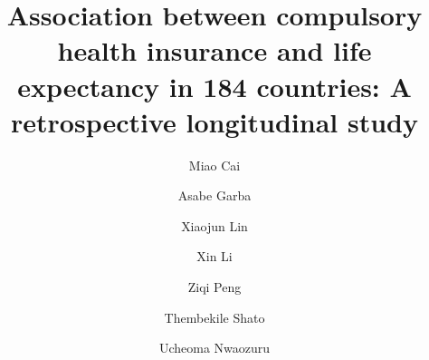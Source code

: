 \documentclass[]{elsarticle} %
\begin{document}
\begin{frontmatter}

  \title{Association between compulsory health insurance and life expectancy in 184 countries: A retrospective longitudinal study}
    \author[SLU]{Miao Cai}
  
    \author[SLU]{Asabe Garba}
  
    \author[SCU]{Xiaojun Lin}
    \author[WHU]{Xin Li}
  
    \author[SLU]{Ziqi Peng}
  
    \author[SLU]{Thembekile Shato}
  
    \author[SLU]{Ucheoma Nwaozuru}
  
      \address[SLU]{College for Public Health and Social Justice, Saint Louis University, Saint Louis, MO, 63108}
    \address[SCU]{West China School of Public Health, Sichuan University, Chengdu, Sichuan, China, 610041}
    \address[WHU]{School of Information Management, Wuhan University, Wuhan, Hubei, China, 430072}
  

\end{frontmatter}
\end{document}
